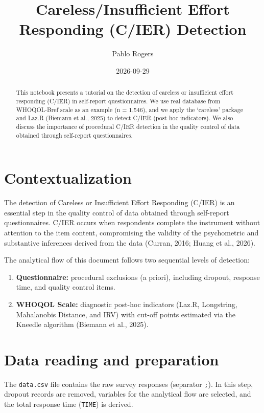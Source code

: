 \documentclass[
  letterpaper,
  DIV=11,
  numbers=noendperiod]{scrartcl}
\title{Careless/Insufficient Effort Responding (C/IER) Detection}
\author{Pablo Rogers}
\date{2026-09-29}
\providecommand{\tightlist}{%
  \setlength{\itemsep}{0pt}\setlength{\parskip}{0pt}}
\begin{document}
\maketitle
\begin{abstract}
This notebook presents a tutorial on the detection of careless or
insufficient effort responding (C/IER) in self-report questionnaires. We
use real database from WHOQOL-Bref scale as an example (n = 1,546), and
we apply the `careless' package and Laz.R (Biemann et al., 2025) to
detect C/IER (post hoc indicators). We also discuss the importance of
procedural C/IER detection in the quality control of data obtained
through self-report questionnaires.
\end{abstract}


\section{Contextualization}\label{contextualization}

The detection of Careless or Insufficient Effort Responding (C/IER) is
an essential step in the quality control of data obtained through
self-report questionnaires. C/IER occurs when respondents complete the
instrument without attention to the item content, compromising the
validity of the psychometric and substantive inferences derived from the
data (Curran, 2016; Huang et al., 2026).

The analytical flow of this document follows two sequential levels of
detection:

\begin{enumerate}
\def\labelenumi{\arabic{enumi}.}
\tightlist
\item
  \textbf{Questionnaire:} procedural exclusions (a priori), including
  dropout, response time, and quality control items.
\item
  \textbf{WHOQOL Scale:} diagnostic post-hoc indicators (Laz.R,
  Longstring, Mahalanobis Distance, and IRV) with cut-off points
  estimated via the Kneedle algorithm (Biemann et al., 2025).
\end{enumerate}

\section{Data reading and
preparation}\label{data-reading-and-preparation}

The \texttt{data.csv} file contains the raw survey responses (separator
\texttt{;}). In this step, dropout records are removed, variables for
the analytical flow are selected, and the total response time
(\texttt{TIME}) is derived.
\end{document}
